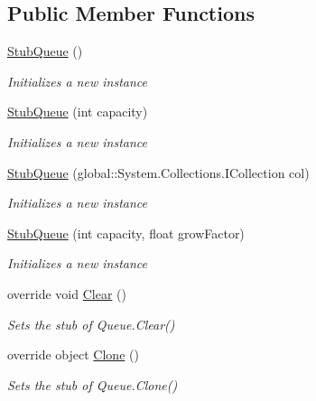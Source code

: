 \subsection*{Public Member Functions}
\begin{DoxyCompactItemize}
\item 
\hyperlink{class_system_1_1_collections_1_1_fakes_1_1_stub_queue_ac881efe441dc7eaa241893edcde65550}{Stub\-Queue} ()
\begin{DoxyCompactList}\small\item\em Initializes a new instance\end{DoxyCompactList}\item 
\hyperlink{class_system_1_1_collections_1_1_fakes_1_1_stub_queue_aec2314dcbc023985b5d5b038fbfd83c3}{Stub\-Queue} (int capacity)
\begin{DoxyCompactList}\small\item\em Initializes a new instance\end{DoxyCompactList}\item 
\hyperlink{class_system_1_1_collections_1_1_fakes_1_1_stub_queue_ab27c2eaa1719843dce953297df9874c1}{Stub\-Queue} (global\-::\-System.\-Collections.\-I\-Collection col)
\begin{DoxyCompactList}\small\item\em Initializes a new instance\end{DoxyCompactList}\item 
\hyperlink{class_system_1_1_collections_1_1_fakes_1_1_stub_queue_a3b9d8c99365efa8abcd818c2d722e542}{Stub\-Queue} (int capacity, float grow\-Factor)
\begin{DoxyCompactList}\small\item\em Initializes a new instance\end{DoxyCompactList}\item 
override void \hyperlink{class_system_1_1_collections_1_1_fakes_1_1_stub_queue_ab2eb1c82273483ee3ffd1547efbc0510}{Clear} ()
\begin{DoxyCompactList}\small\item\em Sets the stub of Queue.\-Clear()\end{DoxyCompactList}\item 
override object \hyperlink{class_system_1_1_collections_1_1_fakes_1_1_stub_queue_adbf3209326947d565e5b87c62e4431d2}{Clone} ()
\begin{DoxyCompactList}\small\item\em Sets the stub of Queue.\-Clone()\end{DoxyCompactList}\item 

\end{DoxyCompactItemize}
